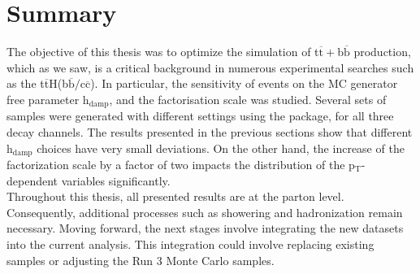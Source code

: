     

\section{Summary}
\noindent The objective of this thesis was to optimize the simulation of t$\overline{\text{t}}+$b$\overline{\text{b}}$ production, which as we saw, is a critical background in numerous experimental searches such as the t$\overline{\text{t}}$H(b$\overline{\text{b}}/$c$\overline{\text{c}}$). In particular, the sensitivity of events on the MC generator free parameter h$_{\text{damp}}$, and the factorisation scale was studied. Several sets of samples were generated with different settings using the {\selectfont{Powheg Box Res}} package, for all three decay channels. The results presented in the previous sections show that different h$_{\text{damp}}$ choices have very small deviations. On the other hand, the increase of the factorization scale by a factor of two impacts the distribution of the p$_{\text{T}}$-dependent variables significantly.\\
% 
\indent Throughout this thesis, all presented results are at the parton level. Consequently, additional processes such as showering and hadronization remain necessary. Moving forward, the next stages involve integrating the new datasets into the current analysis. This integration could involve replacing existing samples or adjusting the Run 3 Monte Carlo samples.


